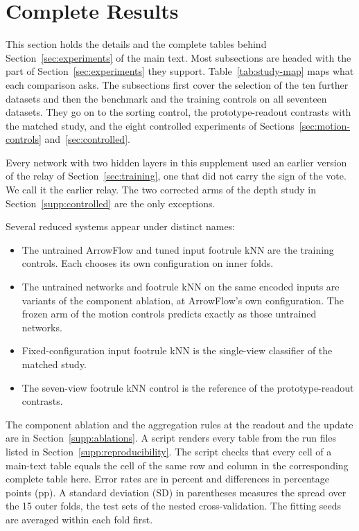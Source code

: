 \section{Complete Results}\label{supp:results}

This section holds the details and the complete tables behind Section~\ref{sec:experiments} of the main text. Most subsections are headed with the part of Section~\ref{sec:experiments} they support. Table~\ref{tab:study-map} maps what each comparison asks. The subsections first cover the selection of the ten further datasets and then the benchmark and the training controls on all seventeen datasets. They go on to the sorting control, the prototype-readout contrasts with the matched study, and the eight controlled experiments of Sections~\ref{sec:motion-controls} and~\ref{sec:controlled}.

Every network with two hidden layers in this supplement used an earlier version of the relay of Section~\ref{sec:training}, one that did not carry the sign of the vote. We call it the earlier relay. The two corrected arms of the depth study in Section~\ref{supp:controlled} are the only exceptions.

Several reduced systems appear under distinct names:
\begin{itemize}[leftmargin=2em,topsep=2pt,itemsep=1pt]
\item The untrained ArrowFlow and tuned input footrule kNN are the training controls. Each chooses its own configuration on inner folds.
\item The untrained networks and footrule kNN on the same encoded inputs are variants of the component ablation, at ArrowFlow's own configuration. The frozen arm of the motion controls predicts exactly as those untrained networks.
\item Fixed-configuration input footrule kNN is the single-view classifier of the matched study.
\item The seven-view footrule kNN control is the reference of the prototype-readout contrasts.
\end{itemize}

The component ablation and the aggregation rules at the readout and the update are in Section~\ref{supp:ablations}. A script renders every table from the run files listed in Section~\ref{supp:reproducibility}. The script checks that every cell of a main-text table equals the cell of the same row and column in the corresponding complete table here. Error rates are in percent and differences in percentage points (pp). A standard deviation (SD) in parentheses measures the spread over the 15 outer folds, the test sets of the nested cross-validation. The fitting seeds are averaged within each fold first.

